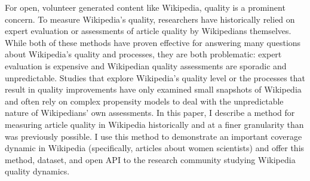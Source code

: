 For open, volunteer generated content like Wikipedia, quality is a prominent concern. To measure Wikipedia's quality, researchers have historically relied on expert evaluation or assessments of article quality by Wikipedians themselves. While both of these methods have proven effective for answering many questions about Wikipedia's quality and processes, they are both problematic: expert evaluation is expensive and Wikipedian quality assessments are sporadic and unpredictable. Studies that explore Wikipedia's quality level or the processes that result in quality improvements have only examined small snapshots of Wikipedia and often rely on complex propensity models to deal with the unpredictable nature of Wikipedians' own assessments. In this paper, I describe a method for measuring article quality in Wikipedia historically and at a finer granularity than was previously possible. I use this method to demonstrate an important coverage dynamic in Wikipedia (specifically, articles about women scientists) and offer this method, dataset, and open API to the research community studying Wikipedia quality dynamics.
